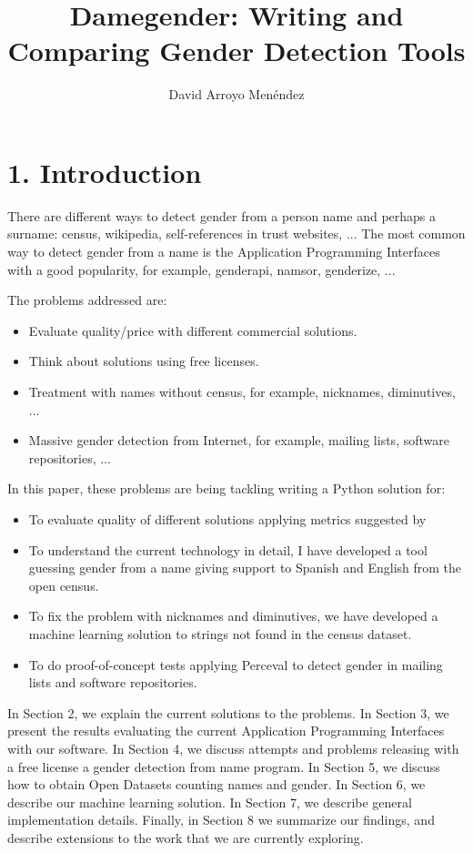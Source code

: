 \documentclass[fleqn,10pt,lineno]{wlpeerj} %
\title{Damegender: Writing and Comparing Gender Detection Tools}
\author[1]{David Arroyo Menéndez}
\affil[1]{Universidad Rey Juan Carlos}
\begin{document}
\flushbottom
\maketitle
\thispagestyle{empty}

\section*{1. Introduction}

There are different ways to detect gender from a person name and
perhaps a surname: census, wikipedia, self-references in trust
websites, ... The most common way to detect gender from a name is the
Application Programming Interfaces with a good popularity, for
example, genderapi, namsor, genderize, ...
~\cite{10.7717/peerj-cs.156}

The problems addressed are:
\begin{itemize}[noitemsep]
\item Evaluate quality/price with different commercial solutions.
\item Think about solutions using free licenses.
\item Treatment with names without census, for example, nicknames,
  diminutives, ...
\item Massive gender detection from Internet, for example, mailing
  lists, software repositories, ...
\end{itemize}

In this paper, these problems are being tackling writing a Python
solution for:
\begin{itemize}[noitemsep]
\item To evaluate quality of different solutions applying metrics
  suggested by ~\cite{10.7717/peerj-cs.156}
\item To understand the current technology in detail, I have developed
  a tool guessing gender from a name giving support to Spanish and
  English from the open census.
\item To fix the problem with nicknames and diminutives, we have
  developed a machine learning solution to strings not found in the
  census dataset.
\item To do proof-of-concept tests applying Perceval to detect
  gender in mailing lists and software repositories.
\end{itemize}

In Section 2, we explain the current solutions to the problems. In
Section 3, we present the results evaluating the current Application
Programming Interfaces with our software. In Section 4, we discuss
attempts and problems releasing with a free license a gender detection
from name program. In Section 5, we discuss how to obtain Open Datasets
counting names and gender. In Section 6, we describe our
machine learning solution. In Section 7, we describe general
implementation details. Finally, in Section 8 we summarize our
findings, and describe extensions to the work that we are currently
exploring.
\end{document}
